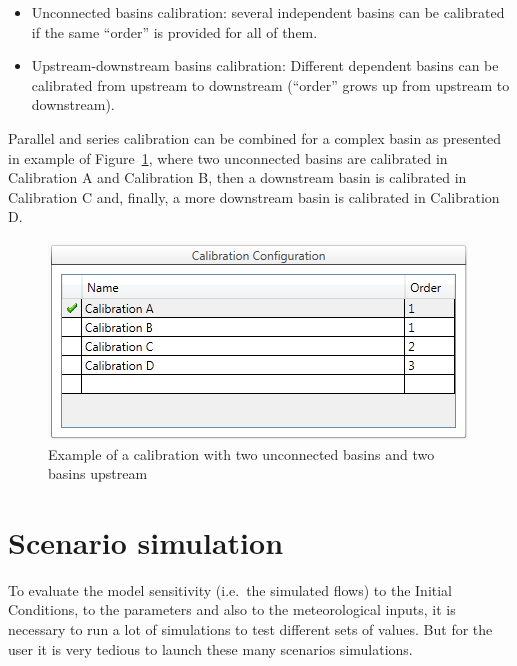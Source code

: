 \documentclass[
  letterpaper,
  DIV=11,
  numbers=noendperiod]{scrreprt}
\begin{document}
\begin{itemize}
\item
  Unconnected basins calibration: several independent basins can be
  calibrated if the same ``order'' is provided for all of them.
\item
  Upstream-downstream basins calibration: Different dependent basins can
  be calibrated from upstream to downstream (``order'' grows up from
  upstream to downstream).
\end{itemize}

Parallel and series calibration can be combined for a complex basin as
presented in example of Figure~\ref{fig-calibrator_example_with_basins},
where two unconnected basins are calibrated in Calibration A and
Calibration B, then a downstream basin is calibrated in Calibration C
and, finally, a more downstream basin is calibrated in Calibration D.

\begin{figure}

{\centering \includegraphics{./figures/fig-calibrator_example_with_basins.png}

}

\caption{\label{fig-calibrator_example_with_basins}Example of a
calibration with two unconnected basins and two basins upstream}

\end{figure}

\hypertarget{scenario-simulation}{%
\chapter{Scenario simulation}\label{scenario-simulation}}

To evaluate the model sensitivity (i.e.~the simulated flows) to the
Initial Conditions, to the parameters and also to the meteorological
inputs, it is necessary to run a lot of simulations to test different
sets of values. But for the user it is very tedious to launch these many
scenarios simulations.
\end{document}
